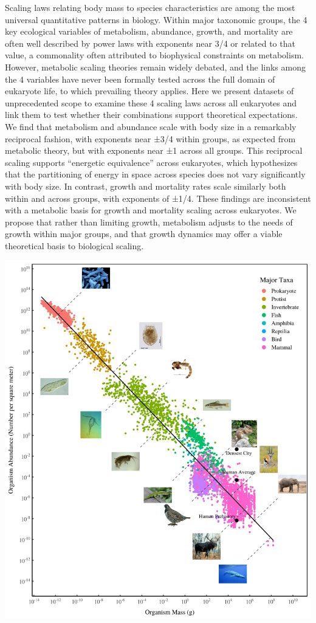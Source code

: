 \documentclass[
]{book}
\begin{document}
Scaling laws relating body mass to species characteristics are among the most universal quantitative patterns in biology. Within major taxonomic groups, the 4 key ecological variables of metabolism, abundance, growth, and mortality are often well described by power laws with exponents near 3/4 or related to that value, a commonality often attributed to biophysical constraints on metabolism. However, metabolic scaling theories remain widely debated, and the links among the 4 variables have never been formally tested across the full domain of eukaryote life, to which prevailing theory applies. Here we present datasets of unprecedented scope to examine these 4 scaling laws across all eukaryotes and link them to test whether their combinations support theoretical expectations. We find that metabolism and abundance scale with body size in a remarkably reciprocal fashion, with exponents near ±3/4 within groups, as expected from metabolic theory, but with exponents near ±1 across all groups. This reciprocal scaling supports ``energetic equivalence'' across eukaryotes, which hypothesizes that the partitioning of energy in space across species does not vary significantly with body size. In contrast, growth and mortality rates scale similarly both within and across groups, with exponents of ±1/4. These findings are inconsistent with a metabolic basis for growth and mortality scaling across eukaryotes. We propose that rather than limiting growth, metabolism adjusts to the needs of growth within major groups, and that growth dynamics may offer a viable theoretical basis to biological scaling.

\includegraphics{fig/metabolic_scaling.jpeg}
\end{document}
